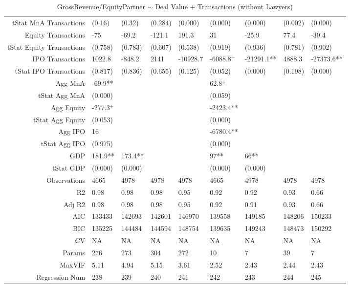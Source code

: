 \begin{table}[ht]
\begin{tabular}{rllllllll}
  tStat MnA Transactions & (0.16) & (0.32) & (0.284) & (0.000) & (0.000) & (0.000) & (0.002) & (0.000) \\ 
  Equity Transactions & -75 & -69.2 & -121.1 & 191.3 & 31 & -25.9 & 77.4 & -39.4 \\ 
  tStat Equity Transactions & (0.758) & (0.783) & (0.607) & (0.538) & (0.919) & (0.936) & (0.781) & (0.902) \\ 
  IPO Transactions & 1022.8 & -848.2 & 2141 & -10928.7 & -6088.8$^{+}$ & -21291.1** & 4888.3 & -27373.6** \\ 
  tStat IPO Transactions & (0.817) & (0.836) & (0.655) & (0.125) & (0.052) & (0.000) & (0.198) & (0.000) \\ 
  Agg MnA & -69.9** &  &  &  & 62.8$^{+}$ &  &  &  \\ 
  tStat Agg MnA & (0.000) &  &  &  & (0.059) &  &  &  \\ 
  Agg Equity & -277.3$^{+}$ &  &  &  & -2423.4** &  &  &  \\ 
  tStat Agg Equity & (0.053) &  &  &  & (0.000) &  &  &  \\ 
  Agg IPO & 16 &  &  &  & -6780.4** &  &  &  \\ 
  tStat Agg IPO & (0.975) &  &  &  & (0.000) &  &  &  \\ 
  GDP & 181.9** & 173.4** &  &  & 97** & 66** &  &  \\ 
  tStat GDP & (0.000) & (0.000) &  &  & (0.000) & (0.000) &  &  \\ 
  Observations & 4665 & 4978 & 4978 & 4978 & 4665 & 4978 & 4978 & 4978 \\ 
  R2 & 0.98 & 0.98 & 0.98 & 0.95 & 0.92 & 0.92 & 0.93 & 0.66 \\ 
  Adj R2 & 0.98 & 0.98 & 0.98 & 0.95 & 0.92 & 0.91 & 0.93 & 0.66 \\ 
  AIC & 133433 & 142693 & 142601 & 146970 & 139558 & 149185 & 148206 & 150233 \\ 
  BIC & 135225 & 144484 & 144594 & 148754 & 139635 & 149243 & 148473 & 150292 \\ 
  CV & NA & NA & NA & NA & NA & NA & NA & NA \\ 
  Params & 276 & 273 & 304 & 272 & 10 & 7 & 39 & 7 \\ 
  MaxVIF & 5.11 & 4.94 & 5.15 & 3.61 & 2.52 & 2.43 & 2.44 & 2.43 \\ 
  Regression Num & 238 & 239 & 240 & 241 & 242 & 243 & 244 & 245 \\ 
   \hline
\end{tabular}
\caption{GrossRevenue/EquityPartner $\sim$ Deal Value + Transactions (without Lawyers)} 
\end{table}
